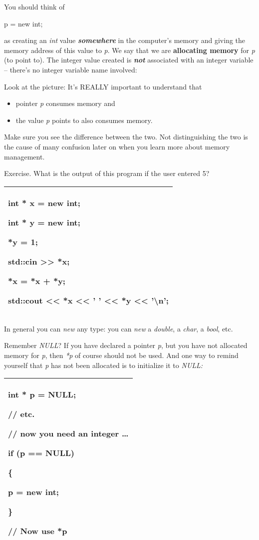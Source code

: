 \documentclass[
]{article}
\providecommand{\tightlist}{%
  \setlength{\itemsep}{0pt}\setlength{\parskip}{0pt}}
\begin{document}
You should think of

p = new int;

as creating an \emph{int} value \emph{\textbf{somewhere} }in the
computer's memory and giving the memory address of this value to
\emph{p}. We say that we are \textbf{allocating memory} for \emph{p} (to
point to). The integer value created is \emph{\textbf{not}} associated
with an integer variable -- there's no integer variable name involved:

Look at the picture: It's REALLY important to understand that

\begin{itemize}
\tightlist
\item
  pointer \emph{p} consumes memory and
\item
  the value \emph{p} points to also consumes memory.
\end{itemize}

Make sure you see the difference between the two. Not distinguishing the
two is the cause of many confusion later on when you learn more about
memory management.

Exercise. What is the output of this program if the user entered 5?

\begin{longtable}[]{@{}l@{}}
\toprule
\endhead
\begin{minipage}[t]{0.97\columnwidth}\raggedright
int * x = new int;

int * y = new int;

*y = 1;

std::cin \textgreater\textgreater{} *x;

*x = *x + *y;

std::cout \textless\textless{} *x \textless\textless{} ' '
\textless\textless{} *y \textless\textless{} '\textbackslash n';\strut
\end{minipage}\tabularnewline
\bottomrule
\end{longtable}

In general you can \emph{new} any type: you can \emph{new} a
\emph{double}, a \emph{char}, a \emph{bool}, etc.

Remember \emph{NULL}? If you have declared a pointer \emph{p}, but you
have not allocated memory for \emph{p}, then \emph{*p} of course should
not be used. And one way to remind yourself that \emph{p} has not been
allocated is to initialize it to \emph{NULL:}

\begin{longtable}[]{@{}l@{}}
\toprule
\endhead
\begin{minipage}[t]{0.97\columnwidth}\raggedright
int * p = NULL;

// etc.

// now you need an integer \ldots{}

if (p == NULL)

\{

p = new int;

\}

// Now use *p\strut
\end{minipage}\tabularnewline
\bottomrule
\end{longtable}
\end{document}
